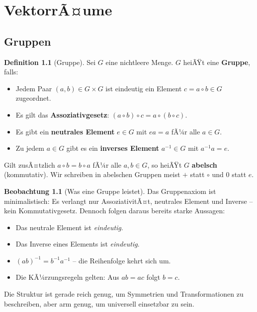 ﻿\documentclass[a4paper,12pt]{report}
\theoremstyle{definition}
\newtheorem{definition}{Definition}
\newtheorem{beobachtung}{Beobachtung}
\begin{document}
\chapter{VektorrÃ¤ume}

\section{Gruppen}

\begin{definition}[Gruppe]
    Sei $G$ eine nichtleere Menge. $G$ heiÃŸt eine \textbf{Gruppe}, falls:
    \begin{itemize}
        \item[-] Jedem Paar $(a, b) \in G \times G$ ist eindeutig ein Element
              $c = a \circ b \in G$ zugeordnet.
        \item[-] Es gilt das \textbf{Assoziativgesetz}:
              $(a \circ b) \circ c = a \circ (b \circ c)$.
        \item[-] Es gibt ein \textbf{neutrales Element} $e \in G$ mit $ea = a$
              fÃ¼r alle $a \in G$.
        \item[-] Zu jedem $a \in G$ gibt es ein \textbf{inverses Element}
              $a^{-1} \in G$ mit $a^{-1} a = e$.
    \end{itemize}
    Gilt zusÃ¤tzlich $a \circ b = b \circ a$ fÃ¼r alle $a, b \in G$, so heiÃŸt
    $G$ \textbf{abelsch} (kommutativ). Wir schreiben in abelschen Gruppen meist
    $+$ statt $\circ$ und $0$ statt $e$.
\end{definition}

\begin{beobachtung}[Was eine Gruppe leistet]
    Das Gruppenaxiom ist minimalistisch: Es verlangt nur AssoziativitÃ¤t,
    neutrales Element und Inverse -- kein Kommutativgesetz. Dennoch folgen
    daraus bereits starke Aussagen:
    \begin{itemize}
        \item[-] Das neutrale Element ist \emph{eindeutig}.
        \item[-] Das Inverse eines Elements ist \emph{eindeutig}.
        \item[-] $(ab)^{-1} = b^{-1} a^{-1}$ -- die Reihenfolge kehrt sich um.
        \item[-] Die KÃ¼rzungsregeln gelten: Aus $ab = ac$ folgt $b = c$.
    \end{itemize}
    Die Struktur ist gerade reich genug, um Symmetrien und Transformationen
    zu beschreiben, aber arm genug, um universell einsetzbar zu sein.
\end{beobachtung}
\end{document}
